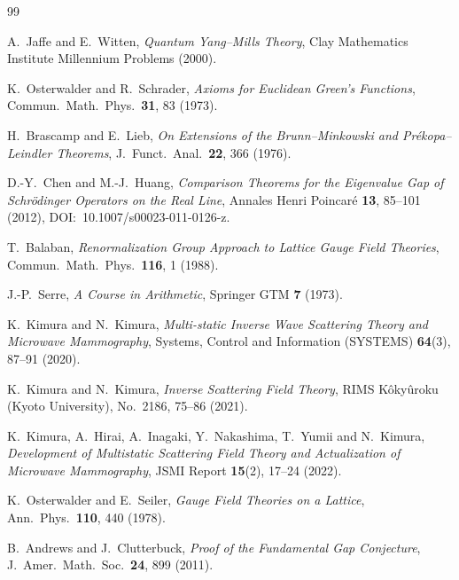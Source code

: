 \documentclass[12pt]{article}
\theoremstyle{plain}
\theoremstyle{definition}
\numberwithin{equation}{section}
\begin{document}
\newpage
\begin{thebibliography}{99}

A.~Jaffe and E.~Witten,
\textit{Quantum Yang--Mills Theory},
Clay Mathematics Institute Millennium Problems (2000).

K.~Osterwalder and R.~Schrader,
\textit{Axioms for Euclidean Green's Functions},
Commun.\ Math.\ Phys.\ \textbf{31}, 83 (1973).

H.~Brascamp and E.~Lieb,
\textit{On Extensions of the Brunn--Minkowski and Pr\'ekopa--Leindler Theorems},
J.~Funct.\ Anal.\ \textbf{22}, 366 (1976).

D.-Y.~Chen and M.-J.~Huang,
\textit{Comparison Theorems for the Eigenvalue Gap of Schr\"odinger Operators on the Real Line},
Annales Henri Poincar\'e \textbf{13}, 85--101 (2012),
DOI:~10.1007/s00023-011-0126-z.

T.~Balaban,
\textit{Renormalization Group Approach to Lattice Gauge Field Theories},
Commun.\ Math.\ Phys.\ \textbf{116}, 1 (1988).

J.-P.~Serre,
\textit{A Course in Arithmetic},
Springer GTM \textbf{7} (1973).

K.~Kimura and N.~Kimura,
\textit{Multi-static Inverse Wave Scattering Theory and Microwave Mammography},
Systems, Control and Information (SYSTEMS) \textbf{64}(3), 87--91 (2020).

K.~Kimura and N.~Kimura,
\textit{Inverse Scattering Field Theory},
RIMS K\^oky\^uroku (Kyoto University), No.~2186, 75--86 (2021).

K.~Kimura, A.~Hirai, A.~Inagaki, Y.~Nakashima, T.~Yumii and N.~Kimura,
\textit{Development of Multistatic Scattering Field Theory and Actualization of Microwave Mammography},
JSMI Report \textbf{15}(2), 17--24 (2022).

K.~Osterwalder and E.~Seiler,
\textit{Gauge Field Theories on a Lattice},
Ann.\ Phys.\ \textbf{110}, 440 (1978).

B.~Andrews and J.~Clutterbuck,
\textit{Proof of the Fundamental Gap Conjecture},
J.~Amer.\ Math.\ Soc.\ \textbf{24}, 899 (2011).

\end{thebibliography}
\end{document}
